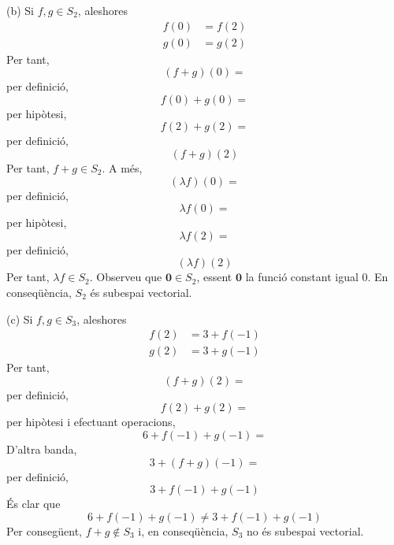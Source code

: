 \begin{solucio}
(b) Si $f,g\in S_{2}$, aleshores%
\begin{align*}
f(0) &=f(2) \\
g(0) &=g(2)
\end{align*}%
Per tant,%
\begin{equation*}
(f+g)(0)=
\end{equation*}%
per definició,%
\begin{equation*}
f(0)+g(0)=
\end{equation*}%
per hipòtesi,%
\begin{equation*}
f(2)+g(2)=
\end{equation*}%
per definició,%
\begin{equation*}
(f+g)(2)
\end{equation*}%
Per tant, $f+g\in S_{2}$. A més,
\begin{equation*}
(\lambda f)(0)=
\end{equation*}%
per definició,%
\begin{equation*}
\lambda f(0)=
\end{equation*}%
per hipòtesi,%
\begin{equation*}
\lambda f(2)=
\end{equation*}%
per definició,%
\begin{equation*}
(\lambda f)(2)
\end{equation*}%
Per tant, $\lambda f\in S_{2}$. Observeu que $\mathbf{0}\in S_{2}$,
essent $\mathbf{0}$ la funció constant igual $0$. En conseqüència, $%
S_{2}$ és subespai vectorial.

(c) Si $f,g\in S_{3}$, aleshores%
\begin{align*}
f(2) &=3+f(-1) \\
g(2) &=3+g(-1)
\end{align*}%
Per tant,%
\begin{equation*}
(f+g)(2)=
\end{equation*}%
per definició,%
\begin{equation*}
f(2)+g(2)=
\end{equation*}%
per hipòtesi i efectuant operacions,%
\begin{equation*}
6+f(-1)+g(-1)=
\end{equation*}%
D’altra banda,%
\begin{equation*}
3+(f+g)(-1)=
\end{equation*}%
per definició,%
\begin{equation*}
3+f(-1)+g(-1)
\end{equation*}%
És clar que
\begin{equation*}
6+f(-1)+g(-1)\neq 3+f(-1)+g(-1)
\end{equation*}%
Per consegüent, $f+g\notin S_{3}$ i, en conseqüència, $S_{3}$ no és
subespai vectorial.
\end{solucio}

